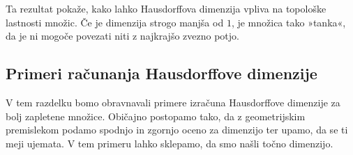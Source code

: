 Ta rezultat pokaže, kako lahko Hausdorffova dimenzija vpliva na topološke lastnosti množic. Če je dimenzija strogo manjša od \(1\), je množica tako »tanka«, da je ni mogoče povezati niti z najkrajšo zvezno potjo. 

\subsection{Primeri računanja Hausdorffove dimenzije}
V tem razdelku bomo obravnavali primere izračuna Hausdorffove dimenzije za bolj zapletene množice. Običajno postopamo tako, da z geometrijskim premislekom podamo spodnjo in zgornjo oceno za dimenzijo ter upamo, da se ti meji ujemata. V tem primeru lahko sklepamo, da smo našli točno dimenzijo.





